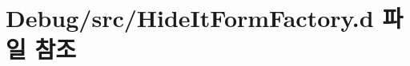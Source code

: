 \hypertarget{_hide_it_form_factory_8d}{\section{Debug/src/\+Hide\+It\+Form\+Factory.d 파일 참조}
\label{_hide_it_form_factory_8d}
}
